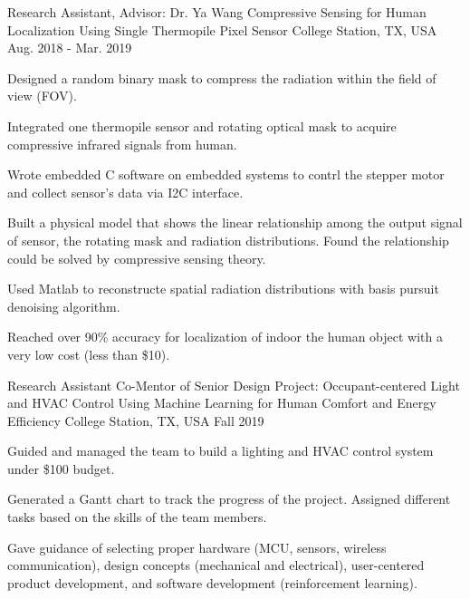 \begin{cventries}
  \cventry
    {Research Assistant, Advisor: Dr. Ya Wang} %
    {Compressive Sensing for Human Localization Using Single Thermopile Pixel Sensor} %
    {College Station, TX, USA} %
    {Aug. 2018 - Mar. 2019} %
    {
      \begin{cvitems} %
        \item Designed a random binary mask to compress the radiation within the field of view (FOV).
        \item Integrated one thermopile sensor and rotating optical mask to acquire compressive infrared signals from human.
        \item Wrote embedded C software on embedded systems to contrl the stepper motor and collect sensor's data via I2C interface.
        \item Built a physical model that shows the linear relationship among the output signal of sensor, the rotating mask and radiation distributions. Found the relationship could be solved by compressive sensing theory.
        \item Used Matlab to reconstructe spatial radiation distributions with basis pursuit denoising algorithm.
        \item Reached over 90\% accuracy for localization of indoor the human object with a very low cost (less than \$10).
      \end{cvitems}
    }

  \cventry
    {Research Assistant} %
    {Co-Mentor of Senior Design Project: Occupant-centered Light and HVAC Control Using Machine Learning for Human Comfort and Energy Efficiency} %
    {College Station, TX, USA} %
    {Fall 2019} %
    {
      \begin{cvitems} %
        \item Guided and managed the team to build a lighting and HVAC control system under \$100 budget. 
        \item Generated a Gantt chart to track the progress of the project. Assigned different tasks based on the skills of the team members.
        \item Gave guidance of selecting proper hardware (MCU, sensors, wireless communication), design concepts (mechanical and electrical), user-centered product development, and software development (reinforcement learning).
      \end{cvitems}
    }


\end{cventries}
